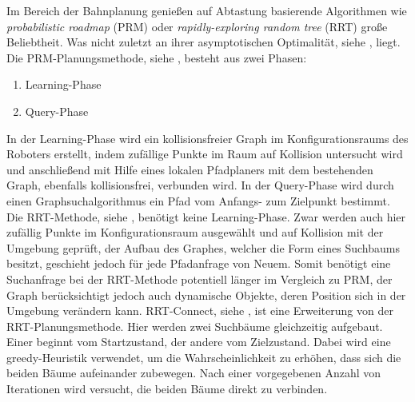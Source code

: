 Im Bereich der Bahnplanung genießen auf Abtastung basierende Algorithmen wie \textit{probabilistic roadmap} (PRM) oder \textit{rapidly-exploring random tree} (RRT) große Beliebtheit. Was nicht zuletzt an ihrer asymptotischen Optimalität, siehe \cite{SamplingAlgos}, liegt.
\newline
Die PRM-Planungsmethode, siehe \cite{PRM}, besteht aus zwei Phasen:
\begin{enumerate}
	\item Learning-Phase
	\item Query-Phase
\end{enumerate}
In der Learning-Phase wird ein kollisionsfreier Graph im Konfigurationsraums des Roboters erstellt, indem zufällige Punkte im Raum auf Kollision untersucht wird und anschließend mit Hilfe eines lokalen Pfadplaners mit dem bestehenden Graph, ebenfalls kollisionsfrei, verbunden wird. In der Query-Phase wird durch einen Graphsuchalgorithmus ein Pfad vom Anfangs- zum Zielpunkt bestimmt.
\newline
Die RRT-Methode, siehe \cite{RRT}, benötigt keine Learning-Phase. Zwar werden auch hier zufällig Punkte im Konfigurationsraum ausgewählt und auf Kollision mit der Umgebung geprüft, der Aufbau des Graphes, welcher die Form eines Suchbaums besitzt, geschieht jedoch für jede Pfadanfrage von Neuem. Somit benötigt eine Suchanfrage bei der RRT-Methode potentiell länger im Vergleich zu PRM, der Graph berücksichtigt jedoch auch dynamische Objekte, deren Position sich in der Umgebung verändern kann.
\newline
RRT-Connect, siehe \cite{RRTConnect}, ist eine Erweiterung von der RRT-Planungsmethode. Hier werden zwei Suchbäume gleichzeitig aufgebaut. Einer beginnt vom Startzustand, der andere vom Zielzustand. Dabei wird eine greedy-Heuristik verwendet, um die Wahrscheinlichkeit zu erhöhen, dass sich die beiden Bäume aufeinander zubewegen. Nach einer vorgegebenen Anzahl von Iterationen wird versucht, die beiden Bäume direkt zu verbinden.
